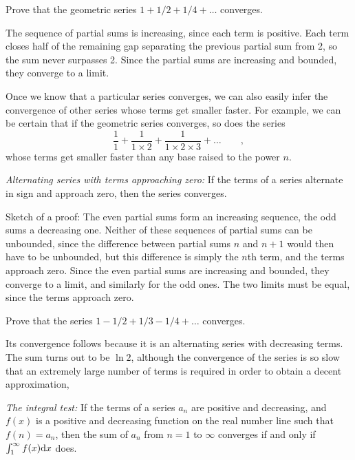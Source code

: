 \begin{eg}
\egquestion Prove that the geometric series
$1+1/2+1/4+\ldots$ converges.

\eganswer The sequence of partial sums is increasing, since each term is positive.
Each term closes half of the remaining gap separating the previous partial sum from 2,
so the sum never surpasses 2. Since the partial sums are increasing and bounded,
they converge to a limit.
\end{eg}

Once we know that a particular series converges, we can also easily infer the convergence
of other series whose terms get smaller faster. For example, we can be certain
that if the geometric series converges, so does the series
\begin{equation*}
  \frac{1}{1} + \frac{1}{1\times 2} + \frac{1}{1\times 2 \times 3} +\ldots \qquad ,
\end{equation*}
whose terms get smaller faster than any base raised to the power $n$.

\emph{Alternating series with terms approaching zero\/:} If the terms of a series alternate
in sign and approach zero, then the series converges.

Sketch of a proof: The even partial sums form an increasing sequence, the odd sums a decreasing one.
Neither of these sequences of partial sums can be unbounded, since the difference between partial
sums $n$ and $n+1$ would then have to be unbounded, but this difference is simply the $n$th term,
and the terms approach zero. Since the even
partial sums are increasing and bounded, they converge to a limit, and similarly for the odd ones.
The two limits must be equal, since the terms approach zero.

\begin{eg}
\egquestion Prove that the series $1-1/2+1/3-1/4+\ldots$ converges.

\eganswer Its convergence follows because it is an alternating series with decreasing terms.
The sum turns out to be $\ln 2$, although the convergence of the series is so slow that
an extremely large number of terms is required in order to obtain a decent approximation,
\end{eg}

\emph{The integral test\/:} If the terms of a series $a_n$ are positive and decreasing, and $f(x)$ is a positive and decreasing function
on the real number line such that $f(n)=a_n$, then the sum of $a_n$ from $n=1$ to $\infty$ converges if and only if
$\int_1^\infty f(x)\textup{d} x$ does.

